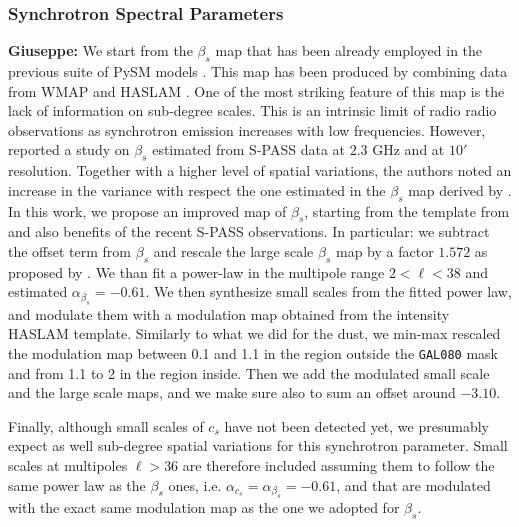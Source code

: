 \subsubsection{Synchrotron Spectral Parameters}\label{sec:beta_s}
 \textbf{Giuseppe:   } 
 We start from the $\beta_s$ map that has been already employed in the previous suite of PySM models \citet{Thorne:2017}. This map has been produced by combining data from WMAP and HASLAM \citep{mivilledeschenes:2008}. One of the most striking feature of this map is  the lack of information on sub-degree scales. This is an intrinsic limit of radio radio observations as   synchrotron emission  increases  with low frequencies.  However, \citet{Krachmalnicoff:2018} reported a study  on $\beta_s$ estimated from S-PASS data at $2.3 $ GHz and at $10'$ resolution.   Together with a higher level of spatial variations, the authors noted an increase in the variance with respect the one estimated in the $\beta_s$ map derived by \citet{mivilledeschenes:2008}.  In this work, we propose an improved  map of $\beta_s $, starting from the template from \citet{mivilledeschenes:2008} and also benefits of  the recent  S-PASS observations. In particular:  we subtract the offset term from $\beta_s$  and rescale the large scale $\beta_s$   map by a factor $1.572$ as proposed by \citet{Krachmalnicoff:2018}. We than fit a  power-law  in the multipole range  $2<\ell<38$ and estimated $\alpha_{\beta_s}=-0.61 $. We then synthesize  small scales  from the fitted power law,  and modulate them with a modulation map obtained from the intensity HASLAM template. Similarly to what we did for the dust, we  min-max rescaled the modulation map  between 0.1 and 1.1 in the region outside the \texttt{GAL080} mask and from 1.1 to 2 in the region inside. 
 Then we add the modulated small scale  and the  large scale maps, and we make sure also to sum  an offset around $-3.10$.
 
Finally, although small scales of $c_s$  have not been detected yet, we presumably expect as well sub-degree spatial variations for this synchrotron parameter. Small  scales at multipoles $\ell>36$  are therefore  included   assuming them to follow  the same power law as  the $\beta_s$ ones,  i.e. $\alpha _{c_s}=\alpha _{\beta_s} = -0.61$, and that are  modulated with the exact same modulation map as the one we  adopted for $\beta_s$.